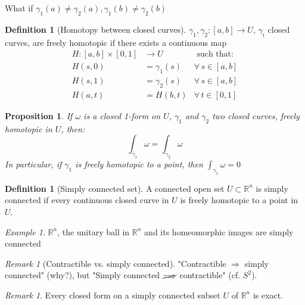 \documentclass[a4paper,11pt,titlepage]{article}
\numberwithin{equation}{section}
\newtheorem{proposition}[theorem]{Proposition}
\theoremstyle{definition}
\newtheorem{definition}[theorem]{Definition}
\theoremstyle{remark}
\newtheorem{remark}[theorem]{Remark}
\newtheorem{example}[theorem]{Example}
\newcommand{\rfield}{\mathbb{R}}
\begin{document}
What if $\gamma_1(a) \not = \gamma_2(a), \gamma_1(b) \not = \gamma_2(b)$
\begin{definition}[Homotopy between closed curves]
$\gamma_1, \gamma_2 \colon [a, b] \rightarrow U$, $\gamma_i$ closed curves, are freely homotopic if there exists a continuous map
\begin{align*}
  H \colon [a, b] \times [0, 1] &\rightarrow U &\text{ such that:} \\
  H(s, 0) &= \gamma_1(s) &\forall\, s \in [a, b] \\
  H(s, 1) &= \gamma_2(s) &\forall\, s \in [a, b] \\
  H(a, t) &= H(b, t) &\forall\, t \in [0, 1]
\end{align*}
\end{definition}

\begin{proposition}
  If $\omega$ is a closed 1-form on $U$, $\gamma_1$ and $\gamma_2$ two closed curves, freely homotopic in $U$, then:
  \begin{equation}
    \int_{\gamma_1} \omega = \int_{\gamma_2} \omega
  \end{equation}
  In particular, if $\gamma_1$ is freely homotopic to a point, then $\int_{\gamma_1} \omega = 0$
\end{proposition}

\begin{definition}[Simply connected set]
  A connected open set $U \subset \rfield^n$ is simply connected if every continuous closed curve in $U$ is freely homotopic to a point in $U$.
\end{definition}

\begin{example}
  $\rfield^n$, the unitary ball in $\rfield^n$ and its homeomorphic images are simply connected
\end{example}

\begin{remark}[Contractible vs. simply connected]
"Contractible $\Longrightarrow$ simply connected" (why?), but "Simply connected $\cancel{\Longrightarrow}$ contractible" (cf. $S^2$).
\end{remark}

\begin{remark}
  Every closed form on a simply connected subset $U$ of $\rfield^n$ is exact.
\end{remark}
\end{document}
